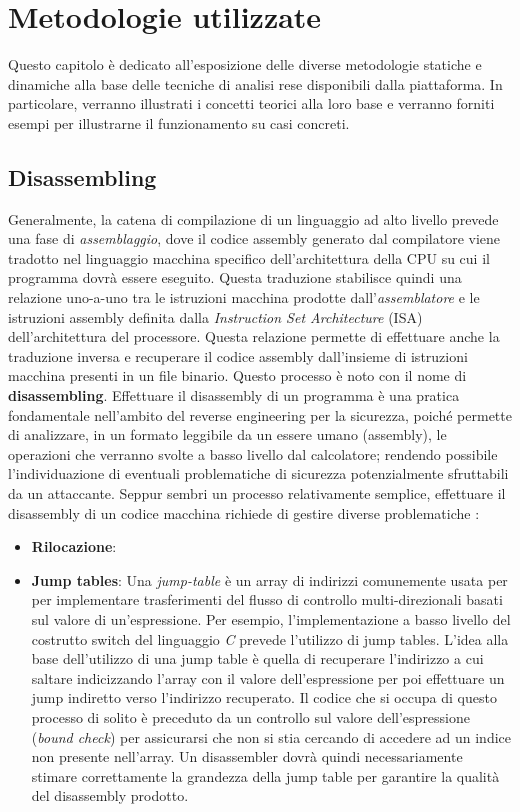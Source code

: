 \documentclass[../main.tex]{subfiles}
\begin{document}
\chapter{Metodologie utilizzate}
\label{chap:oth}
Questo capitolo è dedicato all'esposizione delle diverse metodologie statiche e dinamiche alla base delle tecniche di analisi rese disponibili dalla piattaforma.
In particolare, verranno illustrati i concetti teorici alla loro base e verranno forniti esempi per illustrarne il funzionamento su casi concreti.
\section{Disassembling}
Generalmente, la catena di compilazione di un linguaggio ad alto livello prevede una fase di \textit{assemblaggio}, dove il codice assembly generato dal compilatore viene tradotto
nel linguaggio macchina specifico dell'architettura della CPU su cui il programma dovrà essere eseguito. Questa traduzione stabilisce quindi una relazione uno-a-uno tra le istruzioni macchina
prodotte dall'\textit{assemblatore} e le istruzioni assembly definita dalla \textit{Instruction Set Architecture} (ISA) dell'architettura del processore.
Questa relazione permette di effettuare anche la traduzione inversa e recuperare il codice assembly dall'insieme di istruzioni macchina presenti in un file binario.
Questo processo è noto con il nome di \textbf{disassembling}. Effettuare il disassembly di un programma è una pratica fondamentale nell'ambito del reverse engineering per la sicurezza, poiché
permette di analizzare, in un formato leggibile da un essere umano (assembly), le operazioni che verranno svolte a basso livello dal calcolatore; rendendo possibile l'individuazione di eventuali problematiche
di sicurezza potenzialmente sfruttabili da un attaccante. Seppur sembri un processo relativamente semplice, effettuare il disassembly di un codice macchina richiede di gestire diverse problematiche \cite{Disassembly2}:
\begin{itemize}
    \item \textbf{Rilocazione}: 
    \item \textbf{Jump tables}: Una \textit{jump-table} è un array di indirizzi comunemente usata per per implementare trasferimenti del flusso di controllo multi-direzionali basati sul valore di un'espressione. Per esempio, l'implementazione a basso livello del costrutto switch del linguaggio \textit{C} prevede l'utilizzo di jump tables.
    L'idea alla base dell'utilizzo di una jump table è quella di recuperare l'indirizzo a cui saltare indicizzando l'array con il valore dell'espressione per poi effettuare un jump indiretto verso l'indirizzo recuperato. Il codice che si occupa di questo processo di solito è preceduto da un controllo sul valore dell'espressione (\textit{bound check}) per assicurarsi che non si stia cercando di accedere ad un indice non presente nell'array.
    Un disassembler dovrà quindi necessariamente stimare correttamente la grandezza della jump table per garantire la qualità del disassembly prodotto.
\end{itemize}
\end{document}
